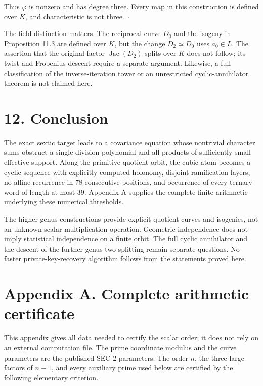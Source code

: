 \documentclass[
  11pt,
  a4paper,
]{article}
\begin{document}
Thus \(\varphi\) is nonzero and has degree three. Every map in this
construction is defined over \(K\), and characteristic is not three.
\(\square\)

The field distinction matters. The reciprocal curve \(D_0\) and the
isogeny in Proposition 11.3 are defined over \(K\), but the change
\(D_2\simeq D_0\) uses \(a_0\in L\). The assertion that the original
factor \(\operatorname{Jac}(D_2)\) splits over \(K\) does not follow;
its twist and Frobenius descent require a separate argument. Likewise, a
full classification of the inverse-iteration tower or an unrestricted
cyclic-annihilator theorem is not claimed here.

\section{12. Conclusion}\label{conclusion}

The exact sextic target leads to a covariance equation whose nontrivial
character sums obstruct a single division polynomial and all products of
sufficiently small effective support. Along the primitive quotient
orbit, the cubic atom becomes a cyclic sequence with explicitly computed
holonomy, disjoint ramification layers, no affine recurrence in 78
consecutive positions, and occurrence of every ternary word of length at
most 39. Appendix A supplies the complete finite arithmetic underlying
these numerical thresholds.

The higher-genus constructions provide explicit quotient curves and
isogenies, not an unknown-scalar multiplication operation. Geometric
independence does not imply statistical independence on a finite orbit.
The full cyclic annihilator and the descent of the further genus-two
splitting remain separate questions. No faster private-key-recovery
algorithm follows from the statements proved here.

\section{Appendix A. Complete arithmetic
certificate}\label{appendix-a.-complete-arithmetic-certificate}

This appendix gives all data needed to certify the scalar order; it does
not rely on an external computation file. The prime coordinate modulus
and the curve parameters are the published SEC 2 parameters. The order
\(n\), the three large factors of \(n-1\), and every auxiliary prime
used below are certified by the following elementary criterion.
\end{document}
